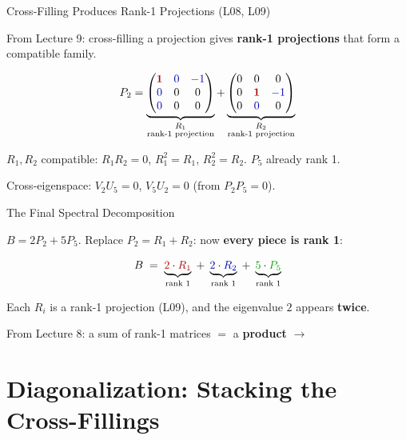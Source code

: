 \documentclass[10pt]{beamer}
\theoremstyle{definition}
\newcommand{\x}[1]{\alert{\textbf{#1}}}
\newcommand{\rd}[1]{{\color{red!70!black}#1}}
\newcommand{\bl}[1]{{\color{blue!70!black}#1}}
\newcommand{\gn}[1]{{\color{green!60!black}#1}}
\newcommand{\pvt}[1]{{\color{red!70!black}\textbf{#1}}}
\newcommand{\crs}[1]{{\color{blue!70!black}#1}}
\begin{document}
\begin{frame}[shrink=5]{Cross-Filling Produces Rank-1 Projections (L08, L09)}

From Lecture 9: cross-filling a projection gives \x{rank-1 projections} that form a compatible family.

\vfill

$$P_2 = \underbrace{\begin{pmatrix}\pvt{1}&\crs{0}&\crs{-1}\\\crs{0}&0&0\\\crs{0}&0&0\end{pmatrix}}_{\substack{R_1\\\text{rank-1 projection}}} + \underbrace{\begin{pmatrix}0&0&0\\0&\pvt{1}&\crs{-1}\\0&\crs{0}&0\end{pmatrix}}_{\substack{R_2\\\text{rank-1 projection}}}$$

\vfill

$R_1, R_2$ compatible: $R_1 R_2 = 0$, $R_1^2 = R_1$, $R_2^2 = R_2$. \quad $P_5$ already rank 1.

\vfill\pause

Cross-eigenspace: $V_2 U_5 = 0$, $V_5 U_2 = 0$ \quad (from $P_2 P_5 = 0$).

\end{frame}


\begin{frame}[shrink=5]{The Final Spectral Decomposition}

$B = 2P_2 + 5P_5$. Replace $P_2 = R_1 + R_2$: now \x{every piece is rank 1}:

\vfill

$$B \;=\; \underbrace{\rd{2}\cdot\rd{R_1}}_{\text{rank 1}} \;+\; \underbrace{\bl{2}\cdot\bl{R_2}}_{\text{rank 1}} \;+\; \underbrace{\gn{5}\cdot\gn{P_5}}_{\text{rank 1}}$$

\vfill

Each $R_i$ is a rank-1 projection (L09), and the eigenvalue $2$ appears \x{twice}.

\vfill\pause

From Lecture 8: a sum of rank-1 matrices $= $ a \x{product} $\longrightarrow$

\end{frame}


\section{Diagonalization: Stacking the Cross-Fillings}
\end{document}
